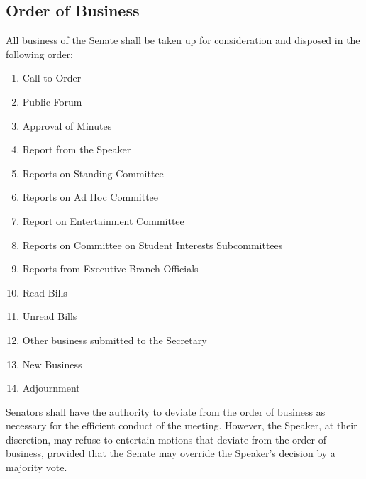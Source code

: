 \documentclass[12pt]{scrreprt}
\begin{document}
\subsection{Order of Business}
All business of the Senate shall be taken up for consideration and disposed in the following
order:
\begin{enumerate}
    \item Call to Order
    \item Public Forum
    \item Approval of Minutes
    \item Report from the Speaker
    \item Reports on Standing Committee
    \item Reports on Ad Hoc Committee
    \item Report on Entertainment Committee
    \item Reports on Committee on Student Interests Subcommittees
    \item Reports from Executive Branch Officials
    \item Read Bills
    \item Unread Bills
    \item Other business submitted to the Secretary
    \item New Business
    \item Adjournment 
\end{enumerate}
Senators shall have the authority to deviate from the order of business as necessary for the
efficient conduct of the meeting. However, the Speaker, at their discretion, may refuse to
entertain motions that deviate from the order of business, provided that the Senate may override
the Speaker’s decision by a majority vote.
\end{document}
